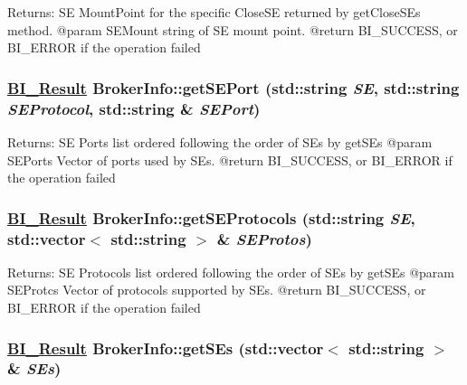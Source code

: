 \begin{Desc}
\item[Returns:]SE Mount\-Point for the specific Close\-SE returned by  get\-Close\-SEs method. @param SEMount string of SE mount point. @return BI\_\-SUCCESS, or BI\_\-ERROR if the operation failed \end{Desc}
\hypertarget{classBrokerInfo_a7}{
\subsubsection[getSEPort]{\setlength{\rightskip}{0pt plus 5cm}\hyperlink{bi__result_8h_a2}{BI\_\-Result} Broker\-Info::get\-SEPort (std::string {\em SE}, std::string {\em SEProtocol}, std::string \& {\em SEPort})}}
\label{classBrokerInfo_a7}


\begin{Desc}
\item[Returns:]SE Ports list ordered following the order of SEs  by get\-SEs @param SEPorts Vector of ports used by SEs. @return BI\_\-SUCCESS, or BI\_\-ERROR if the operation failed \end{Desc}
\hypertarget{classBrokerInfo_a6}{
\subsubsection[getSEProtocols]{\setlength{\rightskip}{0pt plus 5cm}\hyperlink{bi__result_8h_a2}{BI\_\-Result} Broker\-Info::get\-SEProtocols (std::string {\em SE}, std::vector$<$ std::string $>$ \& {\em SEProtos})}}
\label{classBrokerInfo_a6}


\begin{Desc}
\item[Returns:]SE Protocols list ordered following the order of SEs  by get\-SEs @param SEProtcs Vector of protocols supported by SEs. @return BI\_\-SUCCESS, or BI\_\-ERROR if the operation failed \end{Desc}
\hypertarget{classBrokerInfo_a5}{
\subsubsection[getSEs]{\setlength{\rightskip}{0pt plus 5cm}\hyperlink{bi__result_8h_a2}{BI\_\-Result} Broker\-Info::get\-SEs (std::vector$<$ std::string $>$ \& {\em SEs})}}
\label{classBrokerInfo_a5}



